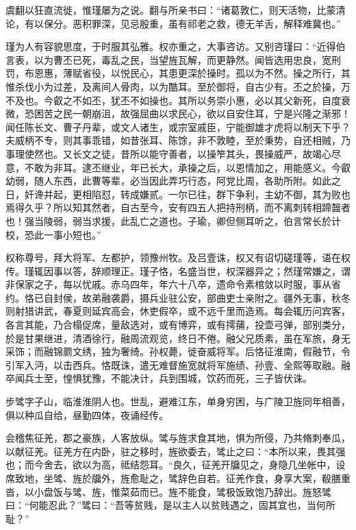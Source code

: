 \documentclass[12pt,UTF8]{ctexbook}
\begin{document}
虞翻以狂直流徙，惟瑾屡为之说。翻与所亲书曰：“诸葛敦仁，则天活物，比蒙清论，有以保分。恶积罪深，见忌殷重，虽有祁老之救，德无羊舌，解释难冀也。”

瑾为人有容貌思度，于时服其弘雅。权亦重之，大事咨访。又别咨瑾曰：“近得伯言表，以为曹丕已死，毒乱之民，当望旌瓦解，而更静然。闻皆选用忠良，宽刑罚，布恩惠，薄赋省役，以悦民心，其患更深於操时。孤以为不然。操之所行，其惟杀伐小为过差，及离间人骨肉，以为酷耳。至於御将，自古少有。丕之於操，万不及也。今叡之不如丕，犹丕不如操也。其所以务崇小惠，必以其父新死，自度衰微，恐困苦之民一朝崩沮，故强屈曲以求民心，欲以自安住耳，宁是兴隆之渐邪！闻任陈长文、曹子丹辈，或文人诸生，或宗室戚臣，宁能御雄才虎将以制天下乎？夫威柄不专，则其事乖错，如昔张耳、陈馀，非不敦睦，至於秉势，自还相贼，乃事理使然也。又长文之徒，昔所以能守善者，以操笮其头，畏操威严，故竭心尽意，不敢为非耳。逮丕继业，年已长大，承操之后，以恩情加之，用能感义。今叡幼弱，随人东西，此曹等辈，必当因此弄巧行态，阿党比周，各助所附。如此之日，奸谗并起，更相陷怼，转成嫌贰。一尔已往，群下争利，主幼不御，其为败也焉得久乎？所以知其然者，自古至今，安有四五人把持刑柄，而不离刺转相蹄齧者也！强当陵弱，弱当求援，此乱亡之道也。子瑜，卿但侧耳听之，伯言常长於计校，恐此一事小短也。”

权称尊号，拜大将军、左都护，领豫州牧。及吕壹诛，权又有诏切磋瑾等，语在权传。瑾辄因事以答，辞顺理正。瑾子恪，名盛当世，权深器异之；然瑾常嫌之，谓非保家之子，每以忧戚。赤乌四年，年六十八卒，遗命令素棺敛以时服，事从省约。恪已自封侯，故弟融袭爵，摄兵业驻公安，部曲吏士亲附之。疆外无事，秋冬则射猎讲武，春夏则延宾高会，休吏假卒，或不远千里而造焉。每会辄历问宾客，各言其能，乃合榻促席，量敌选对，或有博弈，或有摴蒱，投壶弓弹，部别类分，於是甘果继进，清酒徐行，融周流观览，终日不倦。融父兄质素，虽在军旅，身无采饰；而融锦罽文绣，独为奢绮。孙权薨，徙奋威将军。后恪征淮南，假融节，令引军入沔，以击西兵。恪既诛，遣无难督施宽就将军施绩、孙壹、全熙等取融。融卒闻兵士至，惶惧犹豫，不能决计，兵到围城，饮药而死，三子皆伏诛。

步骘字子山，临淮淮阴人也。世乱，避难江东，单身穷困，与广陵卫旌同年相善，俱以种瓜自给，昼勤四体，夜诵经传。

会稽焦征羌，郡之豪族，人客放纵。骘与旌求食其地，惧为所侵，乃共脩刺奉瓜，以献征羌。征羌方在内卧，驻之移时，旌欲委去，骘止之曰：“本所以来，畏其强也；而今舍去，欲以为高，祗结怨耳。“良久，征羌开牖见之，身隐几坐帐中，设席致地，坐骘、旌於牖外，旌愈耻之，骘辞色自若。征羌作食，身享大案，殽膳重沓，以小盘饭与骘、旌，惟菜茹而已。旌不能食，骘极饭致饱乃辞出。旌怒骘曰：“何能忍此？”骘曰：“吾等贫贱，是以主人以贫贱遇之，固其宜也，当何所耻？”
\end{document}
